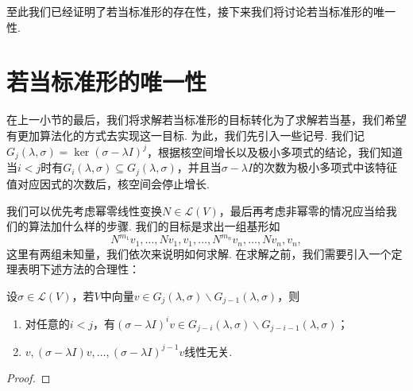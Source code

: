 至此我们已经证明了若当标准形的存在性，接下来我们将讨论若当标准形的唯一性.

\section{若当标准形的唯一性}
在上一小节的最后，我们将求解若当标准形的目标转化为了求解若当基，我们希望有更加算法化的方式去实现这一目标. 为此，我们先引入一些记号. 我们记$G_j(\lambda,\sigma)=\ker (\sigma-\lambda I)^j$，根据核空间增长以及极小多项式的结论，我们知道当$i<j$时有$G_i(\lambda,\sigma)\subseteq G_j(\lambda,\sigma)$，并且当$\sigma-\lambda I$的次数为极小多项式中该特征值对应因式的次数后，核空间会停止增长.

我们可以优先考虑幂零线性变换$N\in \mathcal{L}(V)$，最后再考虑非幂零的情况应当给我们的算法加什么样的步骤. 我们的目标是求出一组基形如
\[N^{m_1}v_1,\ldots,Nv_1,v_1,\ldots,N^{m_n}v_n,\ldots,Nv_n,v_n,\]
这里有两组未知量，我们依次来说明如何求解. 在求解之前，我们需要引入一个定理表明下述方法的合理性：
\begin{theorem}
    设$\sigma\in \mathcal{L}(V)$，若$V$中向量$v\in G_j(\lambda,\sigma)\backslash G_{j-1}(\lambda,\sigma)$，则
    \begin{enumerate}
        \item 对任意的$i<j$，有$(\sigma-\lambda I)^iv\in G_{j-i}(\lambda,\sigma)\backslash G_{j-i-1}(\lambda,\sigma)$；

        \item $v,(\sigma-\lambda I)v,\ldots,(\sigma-\lambda I)^{j-1}v$线性无关.
    \end{enumerate}
\end{theorem}

\begin{proof}

\end{proof}

